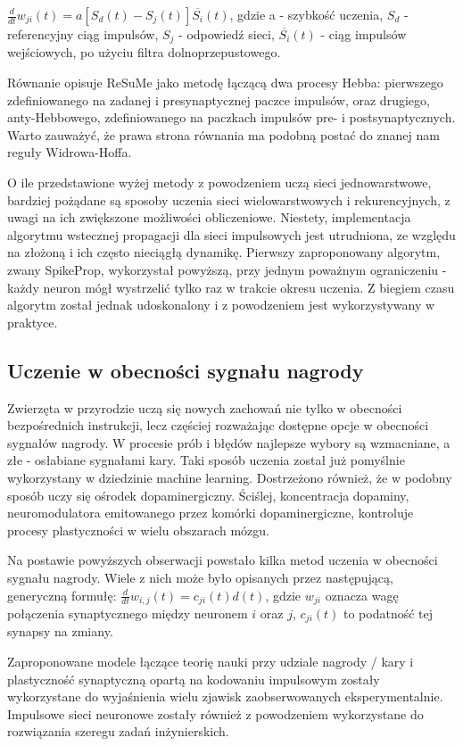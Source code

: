 $\frac{d}{dt} w_{ji}(t) = a \left[S_d(t) - S_j(t) \right] \overline{S_i}(t)$, gdzie a - szybkość uczenia, $S_d$ - referencyjny ciąg impulsów, $S_j$ - odpowiedź sieci, $\overline{S_i}(t)$ - ciąg impulsów wejściowych, po użyciu filtra dolnoprzepustowego.

Równanie opisuje ReSuMe jako metodę łączącą dwa procesy Hebba: pierwszego zdefiniowanego na zadanej i presynaptycznej paczce impulsów, oraz drugiego, anty-Hebbowego, zdefiniowanego na paczkach impulsów pre- i postsynaptycznych. Warto zauważyć, że prawa strona równania ma podobną postać do znanej nam reguły Widrowa-Hoffa.

O ile przedstawione wyżej metody z powodzeniem uczą sieci jednowarstwowe, bardziej pożądane są sposoby uczenia sieci wielowarstwowych i rekurencyjnych, z uwagi na ich zwiększone możliwości obliczeniowe. Niestety, implementacja algorytmu wstecznej propagacji dla sieci impulsowych jest utrudniona, ze względu na złożoną i ich często nieciągłą dynamikę. Pierwszy zaproponowany algorytm, zwany SpikeProp, wykorzystał powyższą, przy jednym poważnym ograniczeniu - każdy neuron mógł wystrzelić tylko raz w trakcie okresu uczenia. Z biegiem czasu algorytm został jednak udoskonalony i z powodzeniem jest wykorzystywany w praktyce.

\subsection{Uczenie w obecności sygnału nagrody} 

Zwierzęta w przyrodzie uczą się nowych zachowań nie tylko w obecności bezpośrednich instrukcji, lecz częściej rozważając dostępne opcje w obecności sygnałów nagrody. W procesie prób i błędów najlepsze wybory są wzmacniane, a złe - osłabiane sygnałami kary. Taki sposób uczenia został już pomyślnie wykorzystany w dziedzinie machine learning. Dostrzeżono również, że w podobny sposób uczy się ośrodek dopaminergiczny. Ściślej, koncentracja dopaminy, neuromodulatora emitowanego przez komórki dopaminergiczne, kontroluje procesy plastyczności w wielu obszarach mózgu. 

Na postawie powyższych obserwacji powstało kilka metod uczenia w obecności sygnału nagrody. Wiele z nich może było opisanych przez następującą, generyczną formułę: 
$\frac{d}{dt}w_{i,j}(t) = c_{ji}(t)d(t)$, gdzie $w_{ji}$ oznacza wagę połączenia synaptycznego między neuronem $i$ oraz $j$, $c_{ji}(t)$ to podatność tej synapsy na zmiany.

Zaproponowane modele łączące teorię nauki przy udziale nagrody / kary i plastyczność synaptyczną opartą na kodowaniu impulsowym zostały wykorzystane do wyjaśnienia wielu zjawisk zaobserwowanych eksperymentalnie. Impulsowe sieci neuronowe zostały również z powodzeniem wykorzystane do rozwiązania szeregu zadań inżynierskich. 
